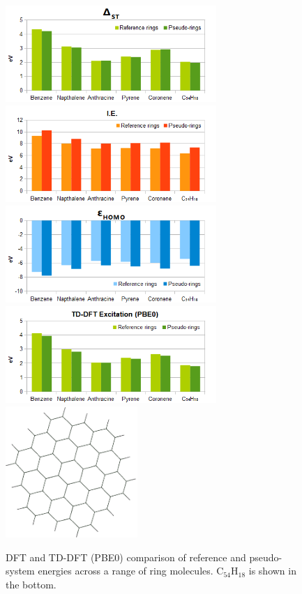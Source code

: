 \documentclass[journal=jctcce,manuscript=article]{achemso}
\begin{document}
\begin{figure}[h]
\includegraphics[width=8cm]{ring_pbe0_excitation}
\includegraphics[width=8cm]{ring_pbe0_ionisation}
\includegraphics[width=8cm]{ring_pbe0_homo}
\includegraphics[width=8cm]{ring_tddft_excitation}
\includegraphics[width=5cm]{19_ring_diagram}
\caption{DFT and TD-DFT (PBE0) comparison of reference and pseudo-system energies across a range of ring molecules. 
C\(_{54}\)H\(_{18}\) is shown in the bottom.}
\label{fig:rings_graphs}
\end{figure}
\end{document}
